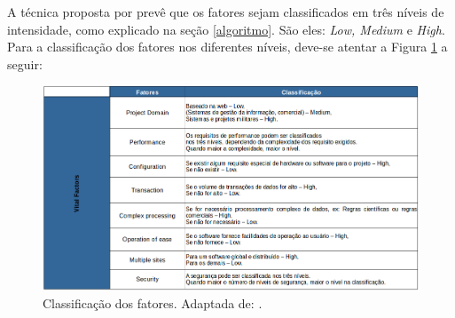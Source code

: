 A técnica proposta por  prevê que os fatores sejam classificados em três níveis de intensidade, como explicado na seção \ref{algoritmo}.
São eles: \textit{Low, Medium} e \textit{High}.
Para a classificação dos fatores nos diferentes níveis, deve-se atentar a Figura \ref{cla_fatores} a seguir:

  \begin{figure}[!htb]
    \centering
    \includegraphics[scale=0.40]{figuras/fatores}
    \caption{Classificação dos fatores. Adaptada de: \cite{bhalerao09}.}
    \label{cla_fatores}
  \end{figure}